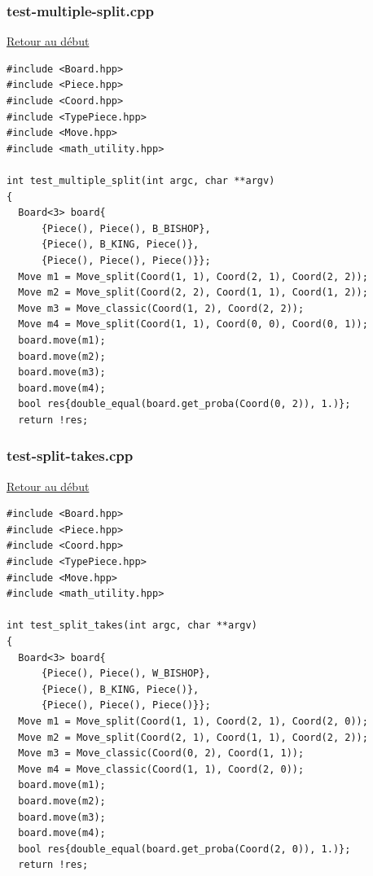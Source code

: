 {\begin{frame}[fragile]
\begin{verbatim}
\end{verbatim}
\end{frame}

\begin{frame}[fragile]
\label{testmultiplesplit.cpp}
\frametitle{test-multiple-split.cpp}
\hyperlink{conclusion}{Retour au début}\newline
\begin{verbatim}
#include <Board.hpp>
#include <Piece.hpp>
#include <Coord.hpp>
#include <TypePiece.hpp>
#include <Move.hpp>
#include <math_utility.hpp>

int test_multiple_split(int argc, char **argv)
{
  Board<3> board{
      {Piece(), Piece(), B_BISHOP},
      {Piece(), B_KING, Piece()},
      {Piece(), Piece(), Piece()}};
  Move m1 = Move_split(Coord(1, 1), Coord(2, 1), Coord(2, 2));
  Move m2 = Move_split(Coord(2, 2), Coord(1, 1), Coord(1, 2));
  Move m3 = Move_classic(Coord(1, 2), Coord(2, 2));
  Move m4 = Move_split(Coord(1, 1), Coord(0, 0), Coord(0, 1));
  board.move(m1);
  board.move(m2);
  board.move(m3);
  board.move(m4);
  bool res{double_equal(board.get_proba(Coord(0, 2)), 1.)};
  return !res;

\end{verbatim}
\end{frame}

\begin{frame}[fragile]
\label{testsplittakes.cpp}
\frametitle{test-split-takes.cpp}
\hyperlink{conclusion}{Retour au début}\newline
\begin{verbatim}
#include <Board.hpp>
#include <Piece.hpp>
#include <Coord.hpp>
#include <TypePiece.hpp>
#include <Move.hpp>
#include <math_utility.hpp>

int test_split_takes(int argc, char **argv)
{
  Board<3> board{
      {Piece(), Piece(), W_BISHOP},
      {Piece(), B_KING, Piece()},
      {Piece(), Piece(), Piece()}};
  Move m1 = Move_split(Coord(1, 1), Coord(2, 1), Coord(2, 0));
  Move m2 = Move_split(Coord(2, 1), Coord(1, 1), Coord(2, 2));
  Move m3 = Move_classic(Coord(0, 2), Coord(1, 1));
  Move m4 = Move_classic(Coord(1, 1), Coord(2, 0));
  board.move(m1);
  board.move(m2);
  board.move(m3);
  board.move(m4);
  bool res{double_equal(board.get_proba(Coord(2, 0)), 1.)};
  return !res;

\end{verbatim}
\end{frame}
}